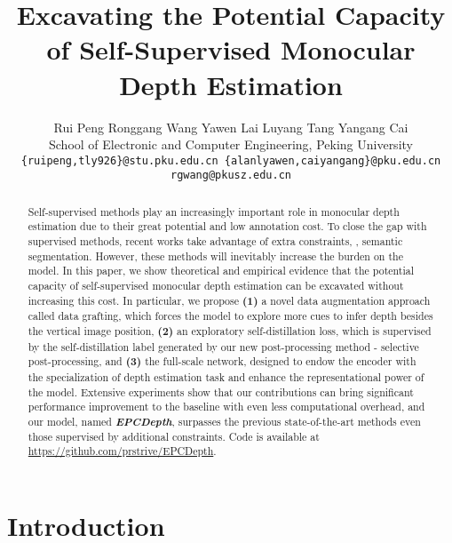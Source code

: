 \documentclass[10pt,twocolumn,letterpaper]{article}
\begin{document}
\title{Excavating the Potential Capacity of Self-Supervised Monocular Depth Estimation}

\author{Rui Peng \qquad Ronggang Wang \textsuperscript{\Letter} \qquad Yawen Lai \qquad Luyang Tang \qquad Yangang Cai\\
School of Electronic and Computer Engineering, Peking University\\
{\tt\small \{ruipeng,tly926\}@stu.pku.edu.cn \{alanlyawen,caiyangang\}@pku.edu.cn rgwang@pkusz.edu.cn}
}

\maketitle
\ificcvfinal\thispagestyle{empty}\fi

\begin{abstract}
   Self-supervised methods play an increasingly important role in monocular depth 
   estimation due to their great potential and low annotation cost. To close the gap with 
   supervised methods, recent works take advantage of extra 
   constraints, \eg, semantic segmentation. However, these methods will inevitably 
   increase the burden on the model. In this paper, we show theoretical and empirical 
   evidence that the potential capacity of self-supervised monocular depth estimation can be 
   excavated without increasing this cost. In particular, we propose {\bf(1)} a novel data 
   augmentation approach called data grafting, which forces the model to explore more cues to 
   infer depth besides the vertical image position, {\bf(2)} an exploratory self-distillation 
   loss, which is supervised by the self-distillation label generated by our new 
   post-processing method - selective post-processing, and {\bf(3)} the full-scale network, 
   designed to endow the encoder with the specialization of depth estimation task and 
   enhance the representational power of the model. Extensive experiments show that our 
   contributions can bring significant performance improvement to the baseline with even less 
   computational overhead, and our model, named {\bf \em EPCDepth}, surpasses the previous 
   state-of-the-art methods even those supervised by additional constraints. 
   Code is available at \url{https://github.com/prstrive/EPCDepth}.
   
\end{abstract}

\section{Introduction} \label{sec:intro}
\end{document}
